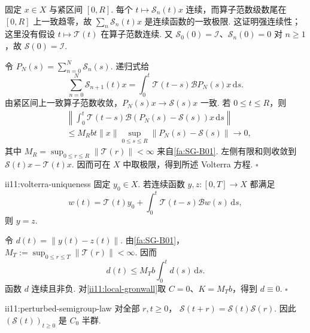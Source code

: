 \begin{FAProof}
固定 \(\displaystyle x\in X\) 与紧区间 \(\displaystyle[0,R]\). 每个 \(\displaystyle t\mapsto\mathcal S_n(t)x\) 连续，而算子范数级数尾在 \(\displaystyle[0,R]\) 上一致趋零，故 \(\displaystyle\sum_n\mathcal S_n(t)x\) 是连续函数的一致极限. 这证明强连续性；这里没有假设 \(\displaystyle t\mapsto\mathcal T(t)\) 在算子范数连续. 又 \(\displaystyle\mathcal S_0(0)=\mathcal I\)、\(\displaystyle\mathcal S_n(0)=0\) 对 \(\displaystyle n\geqslant1\)，故 \(\displaystyle\mathcal S(0)=\mathcal I\).

令 \(\displaystyle P_N(s)=\sum_{n=0}^{N}\mathcal S_n(s)\). 递归式给
\[
\sum_{n=0}^{N}\mathcal S_{n+1}(t)x
=
\int_0^t
\mathcal T(t-s)\mathcal BP_N(s)x
\,\mathrm{d}s.
\]
由紧区间上一致算子范数收敛，\(\displaystyle P_N(s)x\to\mathcal S(s)x\) 一致. 若 \(\displaystyle0\leqslant t\leqslant R\)，则
\[
\begin{aligned}
&\left\|
\int_0^t
\mathcal T(t-s)\mathcal B(P_N(s)-\mathcal S(s))x
\,\mathrm{d}s
\right\|\\
&\leqslant
M_Rbt\|x\|
\sup_{0\leqslant s\leqslant R}
\|P_N(s)-\mathcal S(s)\|
\longrightarrow0,
\end{aligned}
\]
其中 \(\displaystyle M_R=\sup_{0\leqslant r\leqslant R}\|\mathcal T(r)\|<\infty\) 来自\autoref{fa:SG-B01}. 左侧有限和则收敛到 \(\displaystyle\mathcal S(t)x-\mathcal T(t)x\). 因而可在 \(\displaystyle X\) 中取极限，得到所述 Volterra 方程.
\hfill\(\square\)
\end{FAProof}

\begin{FALemma}{ii11:volterra-uniqueness}
固定 \(\displaystyle y_0\in X\). 若连续函数 \(\displaystyle y,z:[0,T]\to X\) 都满足
\[
w(t)
=
\mathcal T(t)y_0
+
\int_0^t\mathcal T(t-s)\mathcal Bw(s)\,\mathrm{d}s,
\]
则 \(\displaystyle y=z\).
\end{FALemma}

\begin{FAProof}
令 \(\displaystyle d(t)=\|y(t)-z(t)\|\). 由\autoref{fa:SG-B01}，\(\displaystyle M_T:=\sup_{0\leqslant r\leqslant T}\|\mathcal T(r)\|<\infty\). 因而
\[
d(t)
\leqslant
M_Tb\int_0^t d(s)\,\mathrm{d}s.
\]
函数 \(\displaystyle d\) 连续且非负. 对\autoref{ii11:local-gronwall}取 \(\displaystyle C=0\)、\(\displaystyle K=M_Tb\)，得到 \(\displaystyle d\equiv0\).
\hfill\(\square\)
\end{FAProof}

\begin{FAProposition}[B][扰动族的半群律]{ii11:perturbed-semigroup-law}
对全部 \(\displaystyle r,t\geqslant0\)， \(\displaystyle \mathcal S(t+r) = \mathcal S(t)\mathcal S(r).\)
因此 \(\displaystyle(\mathcal S(t))_{t\geqslant0}\) 是 \(\displaystyle C_0\) 半群.
\end{FAProposition}

